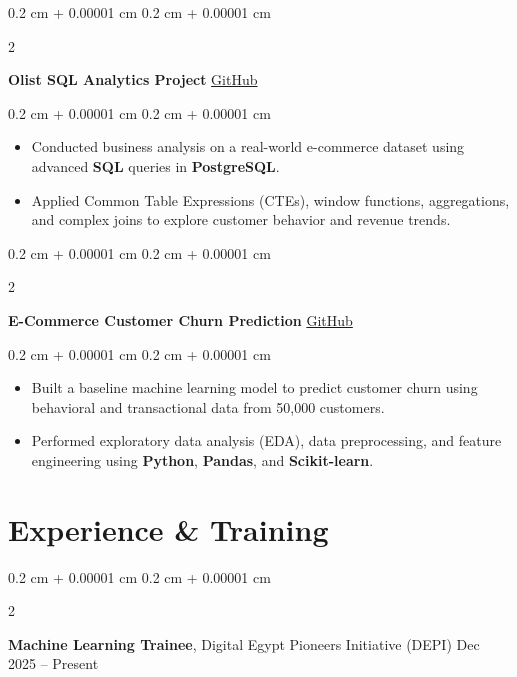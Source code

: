 \documentclass[10pt, letterpaper]{article}
\newenvironment{highlights}{
    \begin{itemize}[
        topsep=0.10 cm,
        parsep=0.10 cm,
        partopsep=0pt,
        itemsep=0pt,
        leftmargin=0.4 cm + 10pt
    ]
}{
    \end{itemize}
} %
\newenvironment{onecolentry}{
    \begin{adjustwidth}{
        0.2 cm + 0.00001 cm
    }{
        0.2 cm + 0.00001 cm
    }
}{
    \end{adjustwidth}
} %
\newenvironment{twocolentry}[2][]{
    \onecolentry
    \def\secondColumn{#2}
    \setcolumnwidth{\fill, 4.5 cm}
    \begin{paracol}{2}
}{
    \switchcolumn \raggedleft \secondColumn
    \end{paracol}
    \endonecolentry
} %
\begin{document}
        \begin{twocolentry}{
            \href{https://github.com/Rowan123204/olist-postgresql}{GitHub}
        }
            \textbf{Olist SQL Analytics Project}\end{twocolentry}

        \vspace{0.10 cm}
        \begin{onecolentry}
            \begin{highlights}
                \item Conducted business analysis on a real-world e-commerce dataset using advanced \textbf{SQL} queries in \textbf{PostgreSQL}.
                \item Applied Common Table Expressions (CTEs), window functions, aggregations, and complex joins to explore customer behavior and revenue trends.
            \end{highlights}
        \end{onecolentry}

        \vspace{0.2 cm}

        \begin{twocolentry}{
            \href{https://github.com/Rowan123204/ecommerce-customer-churn}{GitHub}
        }
            \textbf{E-Commerce Customer Churn Prediction}\end{twocolentry}

        \vspace{0.10 cm}
        \begin{onecolentry}
            \begin{highlights}
                \item Built a baseline machine learning model to predict customer churn using behavioral and transactional data from 50,000 customers.
                \item Performed exploratory data analysis (EDA), data preprocessing, and feature engineering using \textbf{Python}, \textbf{Pandas}, and \textbf{Scikit-learn}.
            \end{highlights}
        \end{onecolentry}

    \section{Experience \& Training}

        \begin{twocolentry}{
            Dec 2025 – Present
        }
            \textbf{Machine Learning Trainee}, Digital Egypt Pioneers Initiative (DEPI)\end{twocolentry}
\end{document}

